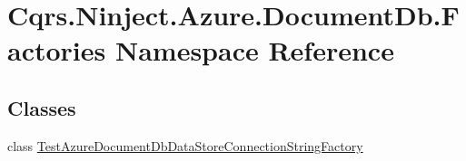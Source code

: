 \hypertarget{namespaceCqrs_1_1Ninject_1_1Azure_1_1DocumentDb_1_1Factories}{}\section{Cqrs.\+Ninject.\+Azure.\+Document\+Db.\+Factories Namespace Reference}
\label{namespaceCqrs_1_1Ninject_1_1Azure_1_1DocumentDb_1_1Factories}
\subsection*{Classes}
\begin{DoxyCompactItemize}
\item 
class \hyperlink{classCqrs_1_1Ninject_1_1Azure_1_1DocumentDb_1_1Factories_1_1TestAzureDocumentDbDataStoreConnectionStringFactory}{Test\+Azure\+Document\+Db\+Data\+Store\+Connection\+String\+Factory}
\end{DoxyCompactItemize}
